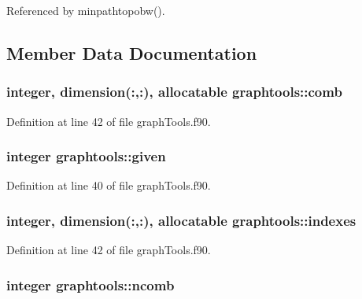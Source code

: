 Referenced by minpathtopobw().



\subsection{Member Data Documentation}
\hypertarget{classgraphtools_a58276cd3a6f06eca01afff94e40135a3}{
\subsubsection[{comb}]{\setlength{\rightskip}{0pt plus 5cm}integer, dimension(\-:,\-:), allocatable graphtools\-::comb}}\label{classgraphtools_a58276cd3a6f06eca01afff94e40135a3}


Definition at line 42 of file graph\-Tools.\-f90.

\hypertarget{classgraphtools_ad9b2084d88501c791d7004540a375e1b}{
\subsubsection[{given}]{\setlength{\rightskip}{0pt plus 5cm}integer graphtools\-::given}}\label{classgraphtools_ad9b2084d88501c791d7004540a375e1b}


Definition at line 40 of file graph\-Tools.\-f90.

\hypertarget{classgraphtools_a06bc686e600e3a5ff5ca5cc86ac94872}{
\subsubsection[{indexes}]{\setlength{\rightskip}{0pt plus 5cm}integer, dimension(\-:,\-:), allocatable graphtools\-::indexes}}\label{classgraphtools_a06bc686e600e3a5ff5ca5cc86ac94872}


Definition at line 42 of file graph\-Tools.\-f90.

\hypertarget{classgraphtools_a2b525a855ff204b1f0888367afad341b}{
\subsubsection[{ncomb}]{\setlength{\rightskip}{0pt plus 5cm}integer graphtools\-::ncomb}}\label{classgraphtools_a2b525a855ff204b1f0888367afad341b}


